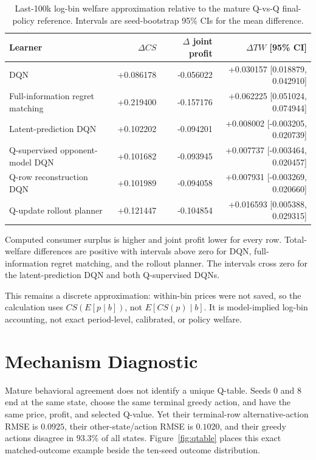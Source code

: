 \documentclass[11pt]{article}
\begin{document}
\begin{table}[H]
\centering
\caption{Last-100k log-bin welfare approximation relative to the mature
Q-vs-Q final-policy reference. Intervals are seed-bootstrap 95\% CIs for the
mean difference.}
\label{tab:binned-welfare}
\scriptsize
\begin{tabular}{lrrr}
\toprule
Learner & \(\Delta CS\) & \(\Delta\) joint profit & \(\Delta TW\) [95\% CI] \\
\midrule
DQN & +0.086178 & -0.056022 & +0.030157 [0.018879, 0.042910] \\
Full-information regret matching & +0.219400 & -0.157176 & +0.062225 [0.051024, 0.074944] \\
Latent-prediction DQN & +0.102202 & -0.094201 & +0.008002 [-0.003205, 0.020739] \\
Q-supervised opponent-model DQN & +0.101682 & -0.093945 & +0.007737 [-0.003464, 0.020457] \\
Q-row reconstruction DQN & +0.101989 & -0.094058 & +0.007931 [-0.003269, 0.020660] \\
Q-update rollout planner & +0.121447 & -0.104854 & +0.016593 [0.005388, 0.029315] \\
\bottomrule
\end{tabular}
\end{table}

Computed consumer surplus is higher and joint profit lower for every row.
Total-welfare differences are positive with intervals above zero for DQN,
full-information regret matching, and the rollout planner. The intervals cross
zero for the latent-prediction DQN and both Q-supervised DQNs.

This remains a discrete approximation: within-bin prices were not saved, so
the calculation uses \(CS(E[p\mid b])\), not \(E[CS(p)\mid b]\). It is
model-implied log-bin accounting, not exact period-level, calibrated, or policy
welfare.

\section{Mechanism Diagnostic}

Mature behavioral agreement does not identify a unique Q-table. Seeds 0 and 8
end at the same state, choose the same terminal greedy action, and have the same
price, profit, and selected Q-value. Yet their terminal-row alternative-action
RMSE is \(0.0925\), their other-state/action RMSE is \(0.1020\), and their
greedy actions disagree in \(93.3\%\) of all states. Figure~\ref{fig:qtable}
places this exact matched-outcome example beside the ten-seed outcome
distribution.
\end{document}
